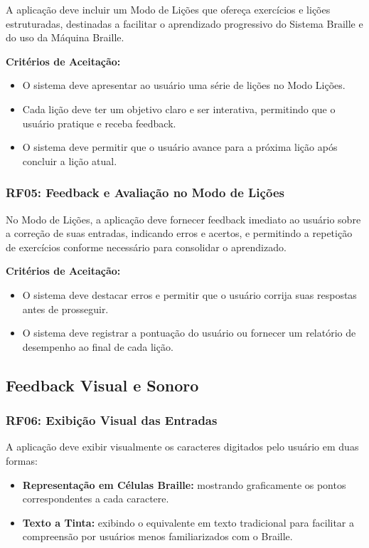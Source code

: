 A aplicação deve incluir um Modo de Lições que ofereça exercícios e lições estruturadas, destinadas a facilitar o aprendizado progressivo do Sistema Braille e do uso da Máquina Braille.

\textbf{Critérios de Aceitação:}
\begin{itemize}
    \item O sistema deve apresentar ao usuário uma série de lições no Modo Lições.
    \item Cada lição deve ter um objetivo claro e ser interativa, permitindo que o usuário pratique e receba feedback.
    \item O sistema deve permitir que o usuário avance para a próxima lição após concluir a lição atual.
\end{itemize}

\subsubsection{\gls{RF}05: Feedback e Avaliação no Modo de Lições}

No Modo de Lições, a aplicação deve fornecer feedback imediato ao usuário sobre a correção de suas entradas, indicando erros e acertos, e permitindo a repetição de exercícios conforme necessário para consolidar o aprendizado.

\textbf{Critérios de Aceitação:}
\begin{itemize}
    \item O sistema deve destacar erros e permitir que o usuário corrija suas respostas antes de prosseguir.
    \item O sistema deve registrar a pontuação do usuário ou fornecer um relatório de desempenho ao final de cada lição.
\end{itemize}

\subsection{Feedback Visual e Sonoro}

\subsubsection{\gls{RF}06: Exibição Visual das Entradas}

A aplicação deve exibir visualmente os caracteres digitados pelo usuário em duas formas:

\begin{itemize}
    \item \textbf{Representação em Células Braille:} mostrando graficamente os pontos correspondentes a cada caractere.
    \item \textbf{Texto a Tinta:} exibindo o equivalente em texto tradicional para facilitar a compreensão por usuários menos familiarizados com o Braille.
\end{itemize}

